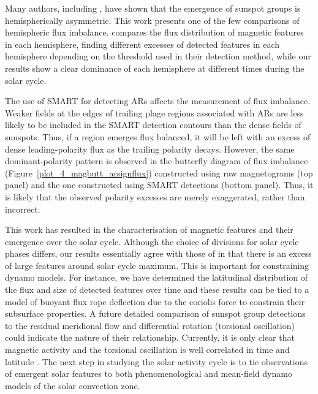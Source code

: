 Many authors, including \citet{Temmer:2006}, have shown that the emergence of sunspot groups is hemispherically asymmetric. This work presents one of the few comparisons of hemispheric flux imbalance. \citet{meunier:2003} compares the flux distribution of magnetic features in each hemisphere, finding different excesses of detected features in each hemisphere depending on the threshold used in their detection method, while our results show a clear dominance of each hemisphere at different times during the solar cycle.

The use of \gls{SMART} for detecting \glspl{AR} affects the measurement of flux imbalance. Weaker fields at the edges of trailing plage regions associated with \glspl{AR} are less likely to be included in the \gls{SMART} detection contours than the dense fields of sunspots. Thus, if a region emerges flux balanced, it will be left with an excess of dense leading-polarity flux as the trailing polarity decays. However, the same dominant-polarity pattern is observed in the butterfly diagram of flux imbalance (Figure~\ref{plot_4_magbutt_arsignflux}) constructed using raw magnetograms (top panel) and the one constructed using \gls{SMART} detections (bottom panel). Thus, it is likely that the observed polarity excesses are merely exaggerated, rather than incorrect.  


This work has resulted in the characterisation of magnetic features and their emergence over the solar cycle. Although the choice of divisions for solar cycle phases differs, our results essentially agree with those of \cite{meunier:2003} in that there is an excess of large features around solar cycle maximum. This is important for constraining dynamo models. For instance, we have determined the latitudinal distribution of the flux and size of detected features over time and these results can be tied to a model of buoyant flux rope deflection due to the coriolis force to constrain their subsurface properties. A future detailed comparison of sunspot group detections to the residual meridional flow and differential rotation (torsional oscillation) could indicate the nature of their relationship. Currently, it is only clear that magnetic activity and the torsional oscillation is  well correlated in time and latitude \citep{Hathaway:2011}. The next step in studying the solar activity cycle is to tie observations of emergent solar features to both phenomenological and mean-field dynamo models of the solar convection zone. 




